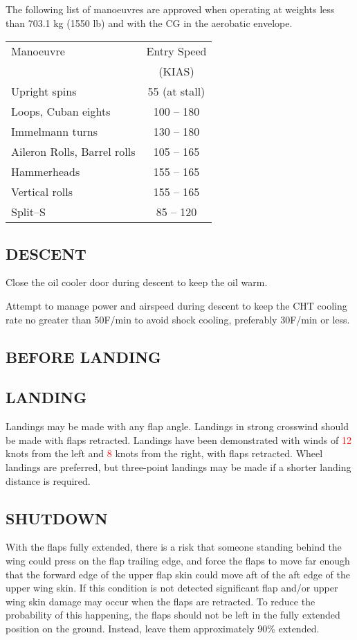 \begin{Note}
The following list of manoeuvres are approved 
when operating at weights less than 703.1 kg (1550 lb) and with the
CG in the aerobatic envelope. 
\end{Note}

\begin{center}\begin{tabular}{lc}
Manoeuvre&
Entry Speed\tabularnewline
&
(KIAS)\tabularnewline
Upright spins&55 (at stall)\tabularnewline
Loops, Cuban eights&
100 -- 180\tabularnewline
Immelmann turns&
130 -- 180\tabularnewline
Aileron Rolls, Barrel rolls&
105 -- 165\tabularnewline
Hammerheads&
155 -- 165\tabularnewline
Vertical rolls&
155 -- 165\tabularnewline
Split--S&
85 -- 120\tabularnewline
\end{tabular}\end{center}

\subsection{DESCENT}
Close the oil cooler door during descent to keep the oil warm.
\begin{Note} 
Attempt to manage power and airspeed during descent to keep the CHT cooling rate no greater than 50\textdegree F/min to avoid shock cooling, preferably 30\textdegree F/min or less.
\end{Note}


\subsection{BEFORE LANDING}

\subsection{LANDING}
Landings may be made with any flap angle. Landings in strong crosswind should be made with flaps retracted. Landings have been demonstrated with winds of \textcolor{red}{12} knots from the left and \textcolor{red}{8} knots from the right, with flaps retracted. Wheel landings are preferred, but three-point landings may be made if a shorter landing distance is required.

\subsection{SHUTDOWN}
\begin{Note}[CAUTION]
With the flaps fully extended, there is a risk that someone standing behind the wing could press on the flap trailing edge, and force the flaps to move far enough that the forward edge of the upper flap skin could move aft of the aft edge of the upper wing skin. If this condition is not detected significant flap and/or upper wing skin damage may occur when the flaps are retracted. To reduce the probability of this happening, the flaps should not be left in the fully extended position on the ground. Instead, leave them approximately 90\% extended.\end{Note}

